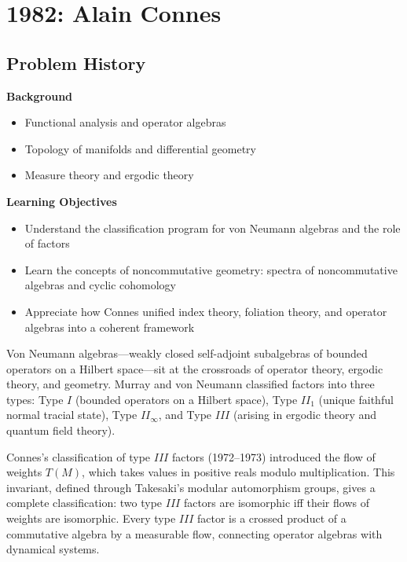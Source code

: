 \chapter{1982: Alain Connes}

\section*{Problem History}

\begin{prereqs}
\noindent \textbf{Background}
\begin{itemize}
\item Functional analysis and operator algebras
\item Topology of manifolds and differential geometry
\item Measure theory and ergodic theory
\end{itemize}
\end{prereqs}

\begin{objectives}
\noindent \textbf{Learning Objectives}
\begin{itemize}
\item Understand the classification program for von Neumann algebras and the role of factors
\item Learn the concepts of noncommutative geometry: spectra of noncommutative algebras and cyclic cohomology
\item Appreciate how Connes unified index theory, foliation theory, and operator algebras into a coherent framework
\end{itemize}
\end{objectives}

Von Neumann algebras---weakly closed self-adjoint subalgebras of bounded
operators on a Hilbert space---sit at the crossroads of operator theory,
ergodic theory, and geometry. Murray and von Neumann classified factors
into three types: Type $I$ (bounded operators on a Hilbert space), Type
$II_1$ (unique faithful normal tracial state), Type $II_\infty$, and
Type $III$ (arising in ergodic theory and quantum field theory).

Connes's classification of type $III$ factors (1972--1973) introduced the
flow of weights $T(M)$, which takes values in positive reals modulo
multiplication. This invariant, defined through Takesaki's modular
automorphism groups, gives a complete classification: two type $III$
factors are isomorphic iff their flows of weights are isomorphic. Every
type $III$ factor is a crossed product of a commutative algebra by a
measurable flow, connecting operator algebras with dynamical systems.

